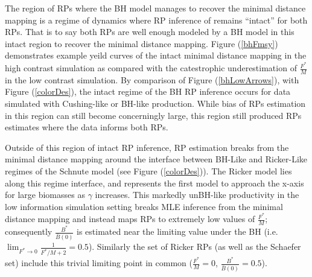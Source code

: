 The region of RPs where the BH model manages to recover the minimal 
distance mapping is a regime of dynamics where RP inference of remains 
``intact'' for both RPs.
That is to say both RPs are well enough modeled by a BH model in this intact 
region to recover the minimal distance mapping. 
Figure (\ref{bhFmsy}) demonstrates example yeild curves of the intact minimal distance 
mapping in the high contrast simulation as compared with the catestrophic underestimation 
of $\frac{F^*}{M}$ in the low contrast simulation.
By comparison of Figure (\ref{bhLowArrows}), with Figure (\ref{colorDes}), the intact regime of 
the BH RP inference occurs for data simulated with Cushing-like or BH-like production. 
While bias of RPs estimation in this region can still become concerningly large, 
this region still produced RPs estimates where the data informs both RPs.

%
Outside of this region of intact RP inference, RP estimation breaks from the minimal 
distance mapping around the interface between BH-Like and Ricker-Like regimes 
of the Schnute model (see Figure (\ref{colorDes})). The Ricker model lies 
along this regime interface, and represents the first model to approach the 
x-axis for large biomasses as $\gamma$ increases. This markedly unBH-like 
productivity in the low information simulation setting breaks MLE inference 
from the minimal distance mapping and instead maps RPs to extremely low values 
of $\frac{F^*}{M}$; consequently $\frac{B^*}{\bar B(0)}$ is estimated near the 
limiting value under the BH (i.e. $\lim_{F^* \to 0}\frac{1}{F^*/M+2}=0.5$).
Similarly the set of Ricker RPs (as well as the Schaefer set) include this
trivial limiting point in common ($\frac{F^*}{M}=0$, $\frac{B^*}{\bar B(0)}=0.5$). 

